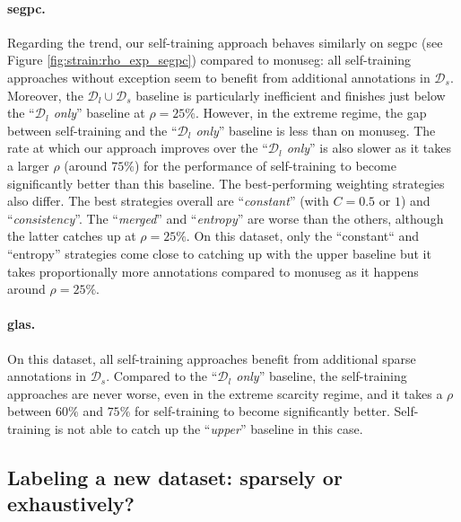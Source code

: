\paragraph{\acrshort{segpc}.} Regarding the trend, our self-training approach behaves similarly on \acrshort{segpc} (see Figure \ref{fig:strain:rho_exp_segpc}) compared to \acrshort{monuseg}: all self-training approaches without exception seem to benefit from additional annotations in $\mathcal{D}_s$. Moreover, the $\mathcal{D}_l \cup \mathcal{D}_s$ baseline is particularly inefficient and finishes just below the ``\textit{$\mathcal{D}_l$ only}'' baseline at $\rho = 25\%$. However, in the extreme regime, the gap between self-training and the ``\textit{$\mathcal{D}_l$ only}'' baseline is less than on \acrshort{monuseg}. The rate at which our approach improves over the ``\textit{$\mathcal{D}_l$ only}'' is also slower as it takes a larger $\rho$ (around $75\%$) for the performance of self-training to become significantly better than this baseline. The best-performing weighting strategies also differ. The best strategies overall are ``\textit{constant}'' (with $C = 0.5$ or $1$) and ``\textit{consistency}''. The ``\textit{merged}'' and ``\textit{entropy}'' are worse than the others, although the latter catches up at $\rho = 25\%$. On this dataset, only the ``constant`` and ``entropy'' strategies come close to catching up with the upper baseline but it takes proportionally more annotations compared to \acrshort{monuseg} as it happens around $\rho = 25\%$.

\paragraph{\acrshort{glas}.} On this dataset, all self-training approaches benefit from additional sparse annotations in $\mathcal{D}_s$. Compared to the ``\textit{$\mathcal{D}_l$ only}'' baseline, the self-training approaches are never worse, even in the extreme scarcity regime, and it takes a $\rho$ between $60\%$ and $75\%$ for self-training to become significantly better. Self-training is not able to catch up the ``\textit{upper}'' baseline in this case. 

\subsection{Labeling a new dataset: sparsely or exhaustively?}
\label{ssec:strain:sparsevsexhaustive}

